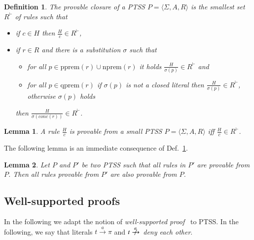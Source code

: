 \documentclass[submission,copyright,creativecommons]{eptcs}
\newtheorem{definition}{Definition}
\newtheorem{lemma}{Lemma}
\newcommand{\dedrule}[2]{\frac{#1}{#2}}
\newcommand{\trans}[1][]{\xrightarrow{\, {#1} \, }}
\newcommand{\ntrans}[1][]{\mathrel{{\trans[#1]}\makebox[0em][r]{$\not$\hspace{2ex}}}{\!}}
\newcommand{\tuple}[1]{\langle{#1}\rangle}
\newcommand{\pprem}[1]{\textrm{pprem}(#1)}
\newcommand{\nprem}[1]{\textrm{nprem}(#1)}
\newcommand{\qprem}[1]{\textrm{qprem}(#1)}
\newcommand{\proves}{\vdash}
\begin{document}
\begin{definition}\label{def:provClosure}
 The \emph{provable closure} of a PTSS $P = \tuple{\Sigma, A, R}$ 
  is the smallest set $R^\proves$ of rules such that
\begin{itemize}
 \item if $c \in H$ then $\dedrule{H}{c} \in R^\proves$,
 \item if $r \in R$ and there is a substitution $\sigma$ such that 
 \begin{itemize}
    \item for all $p \in \pprem{r} \cup \nprem{r}$ it holds $\dedrule{H}{\sigma(p)} \in R^\proves$  and
    \item for all $p \in \qprem{r}$ if $\sigma(p)$ is not a closed literal then $\dedrule{H}{\sigma(p)} \in R^\proves$, otherwise $\sigma(p)$ holds
 \end{itemize}   
  then  $\dedrule{H}{\sigma(conc(r))} \in R^\proves$.
\end{itemize}
\end{definition}

\begin{lemma}\label{lemma:closure}
 A rule $\dedrule{H}{c}$ is provable from a small PTSS $P = \tuple{\Sigma, A, R}$ iff
 $\dedrule{H}{c} \in R^\proves$.
\end{lemma}

The following lemma is an immediate consequence of Def.~\ref{def:provClosure}.
\begin{lemma}\label{lemma:provability}
 Let $P$ and $P'$ be two PTSS such that all rules in $P'$ are provable from $P$. Then all rules provable from $P'$ are also provable from $P$.
\end{lemma}


\subsection{Well-supported proofs}


In the following we adapt the notion of \emph{well-supported proof}~\cite{vanGlabbeek04} to PTSS.
In the following, we say that literals $t \trans[a] \pi$ and $t \ntrans[a]$ \emph{deny each other}.
\end{document}
